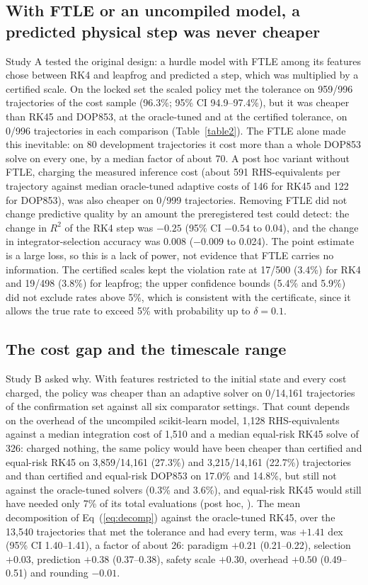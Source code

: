 \documentclass[10pt,letterpaper]{article}
\begin{document}
\subsection*{With FTLE or an uncompiled model, a predicted physical step was never cheaper}
Study A tested the original design: a hurdle model with FTLE among its features chose between RK4 and leapfrog and predicted a step, which was multiplied by a certified scale. On the locked set the scaled policy met the tolerance on 959/996 trajectories of the cost sample (96.3\%; 95\% CI 94.9--97.4\%), but it was cheaper than RK45 and DOP853, at the oracle-tuned and at the certified tolerance, on 0/996 trajectories in each comparison (Table~\ref{table2}). The FTLE alone made this inevitable: on 80 development trajectories it cost more than a whole DOP853 solve on every one, by a median factor of about 70. A post hoc variant without FTLE, charging the measured inference cost (about 591 RHS-equivalents per trajectory against median oracle-tuned adaptive costs of 146 for RK45 and 122 for DOP853), was also cheaper on 0/999 trajectories. Removing FTLE did not change predictive quality by an amount the preregistered test could detect: the change in $R^{2}$ of the RK4 step was $-0.25$ (95\% CI $-0.54$ to 0.04), and the change in integrator-selection accuracy was 0.008 ($-0.009$ to 0.024). The point estimate is a large loss, so this is a lack of power, not evidence that FTLE carries no information. The certified scales kept the violation rate at 17/500 (3.4\%) for RK4 and 19/498 (3.8\%) for leapfrog; the upper confidence bounds (5.4\% and 5.9\%) did not exclude rates above 5\%, which is consistent with the certificate, since it allows the true rate to exceed 5\% with probability up to $\delta = 0.1$.

\subsection*{The cost gap and the timescale range}
Study B asked why. With features restricted to the initial state and every cost charged, the policy was cheaper than an adaptive solver on 0/14,161 trajectories of the confirmation set against all six comparator settings. That count depends on the overhead of the uncompiled scikit-learn model, 1,128 RHS-equivalents against a median integration cost of 1,510 and a median equal-risk RK45 solve of 326: charged nothing, the same policy would have been cheaper than certified and equal-risk RK45 on 3,859/14,161 (27.3\%) and 3,215/14,161 (22.7\%) trajectories and than certified and equal-risk DOP853 on 17.0\% and 14.8\%, but still not against the oracle-tuned solvers (0.3\% and 3.6\%), and equal-risk RK45 would still have needed only 7\% of its total evaluations (post hoc, ). The mean decomposition of Eq~(\ref{eq:decomp}) against the oracle-tuned RK45, over the 13,540 trajectories that met the tolerance and had every term, was $+1.41$ dex (95\% CI 1.40--1.41), a factor of about 26: paradigm $+0.21$ (0.21--0.22), selection $+0.03$, prediction $+0.38$ (0.37--0.38), safety scale $+0.30$, overhead $+0.50$ (0.49--0.51) and rounding $-0.01$.
\end{document}
